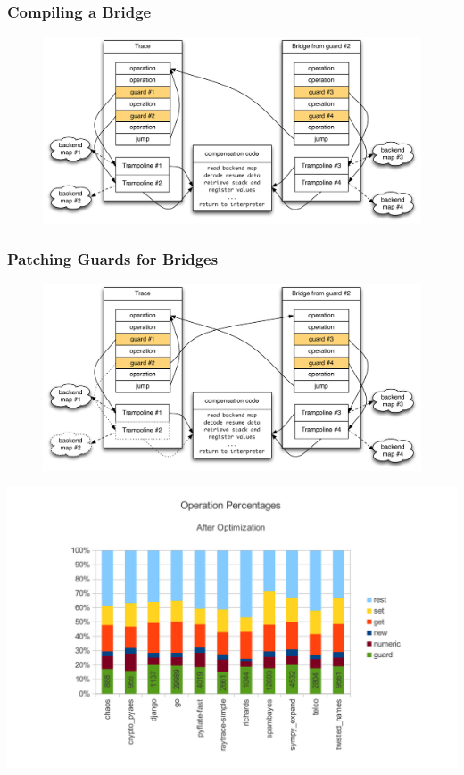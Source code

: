 \documentclass[utf8x]{beamer}
\begin{document}
\begin{frame}
  \frametitle{Compiling a Bridge}
  \begin{figure}
  \centering
  \includegraphics[width=1\textwidth]{figures/bridge_compiled.pdf}
  \end{figure}
\end{frame}
\begin{frame}
  \frametitle{Patching Guards for Bridges}
  \begin{figure}
  \centering
  \includegraphics[width=1\textwidth]{figures/bridge_patched.pdf}
  \end{figure}
\end{frame}


\begin{frame}
  \includegraphics[scale=0.6]{figures/op_percentage_after}
\end{frame}
\end{document}
